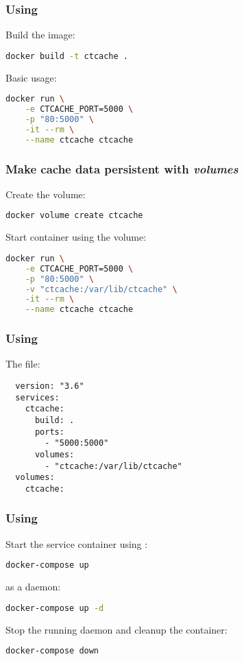\documentclass[compress,table,xcolor=table]{beamer}
\begin{document}
\begin{frame}[fragile]
  \frametitle{Using }
  \LARGE
  Build the image:
  \begin{lstlisting}[language=bash]
  docker build -t ctcache .
  \end{lstlisting}
  Basic usage:
  \begin{lstlisting}[language=bash]
  docker run \
    -e CTCACHE_PORT=5000 \
    -p "80:5000" \
    -it --rm \
    --name ctcache ctcache
  \end{lstlisting}
\end{frame}
\begin{frame}[fragile]
  \frametitle{Make cache data persistent with  {\em volumes}}
  \LARGE
  Create the volume:
  \begin{lstlisting}[language=bash]
  docker volume create ctcache
  \end{lstlisting}
  Start container using the volume:
  \begin{lstlisting}[language=bash]
  docker run \
    -e CTCACHE_PORT=5000 \
    -p "80:5000" \
    -v "ctcache:/var/lib/ctcache" \
    -it --rm \
    --name ctcache ctcache
  \end{lstlisting}
\end{frame}
\begin{frame}[fragile]
  \frametitle{Using }
  \LARGE
  The  file:
  \begin{lstlisting}
  version: "3.6"
  services:
    ctcache:
      build: .
      ports:
        - "5000:5000"
      volumes:
        - "ctcache:/var/lib/ctcache"
  volumes:
    ctcache:
  \end{lstlisting}
\end{frame}
\begin{frame}[fragile]
  \frametitle{Using }
  \Large
  Start the service container using :
  \begin{lstlisting}[language=bash]
  docker-compose up
  \end{lstlisting}
  as a daemon:
  \begin{lstlisting}[language=bash]
  docker-compose up -d
  \end{lstlisting}
  Stop the running daemon and cleanup the container:
  \begin{lstlisting}[language=bash]
  docker-compose down
  \end{lstlisting}
\end{frame}
\end{document}
